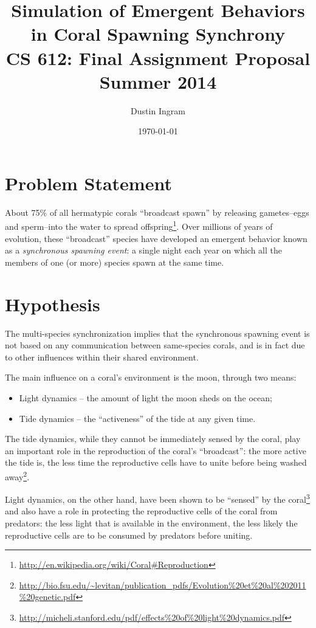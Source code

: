 \documentclass{article}
\title{\textbf{Simulation of Emergent Behaviors in Coral Spawning Synchrony} \\
CS 612: Final Assignment Proposal \\Summer 2014 }
\author{Dustin Ingram}
\date{\today}
\begin{document}
\maketitle

\section{Problem Statement}
About 75\% of all hermatypic corals ``broadcast spawn'' by releasing
gametes--eggs and sperm--into the water to spread
offspring\footnote{\url{http://en.wikipedia.org/wiki/Coral#Reproduction}}. Over
millions of years of evolution, these ``broadcast'' species have developed an
emergent behavior known as a \emph{synchronous spawning event}: a single night
each year on which all the members of one (or more) species spawn at the same
time.

\section{Hypothesis}
The multi-species synchronization implies that the synchronous spawning event is
not based on any communication between same-species corals, and is in fact due
to other influences within their shared environment.

The main influence on a coral's environment is the moon, through two means:
\begin{itemize}
    \item Light dynamics -- the amount of light the moon sheds on the ocean;
    \item Tide dynamics -- the ``activeness'' of the tide at any given time.
\end{itemize}

The tide dynamics, while they cannot be immediately sensed by the coral, play an
important role in the reproduction of the coral's ``broadcast'': the more active
the tide is, the less time the reproductive cells have to unite before being
washed
away\footnote{\url{http://bio.fsu.edu/~levitan/publication_pdfs/Evolution\%20et\%20al\%202011\%20genetic.pdf}}.

Light dynamics, on the other hand, have been shown to be ``sensed'' by the
coral\footnote{\url{http://micheli.stanford.edu/pdf/effects\%20of\%20light\%20dynamics.pdf}}
and also have a role in protecting the reproductive cells of the coral from
predators: the less light that is available in the environment, the less likely
the reproductive cells are to be consumed by predators before uniting.
\end{document}
